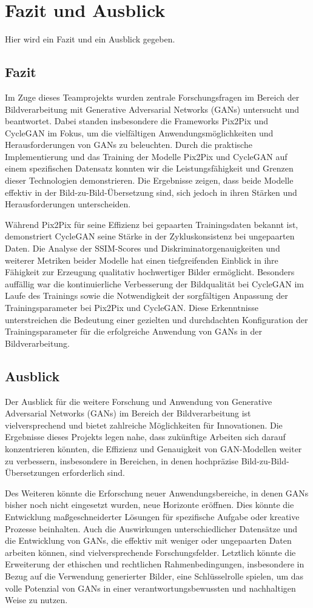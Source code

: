 \chapter{Fazit und Ausblick}
Hier wird ein Fazit und ein Ausblick gegeben.

\section{Fazit}
Im Zuge dieses Teamprojekts wurden zentrale Forschungsfragen im Bereich der Bildverarbeitung mit Generative Adversarial Networks (GANs) untersucht und beantwortet. Dabei standen insbesondere die Frameworks Pix2Pix und CycleGAN im Fokus, um die vielfältigen Anwendungsmöglichkeiten und Herausforderungen von GANs zu beleuchten. Durch die praktische Implementierung und das Training der Modelle Pix2Pix und CycleGAN auf einem spezifischen Datensatz konnten wir die Leistungsfähigkeit und Grenzen dieser Technologien demonstrieren. Die Ergebnisse zeigen, dass beide Modelle effektiv in der Bild-zu-Bild-Übersetzung sind, sich jedoch in ihren Stärken und Herausforderungen unterscheiden.

Während Pix2Pix für seine Effizienz bei gepaarten Trainingsdaten bekannt ist, demonstriert CycleGAN seine Stärke in der Zykluskonsistenz bei ungepaarten Daten. Die Analyse der SSIM-Scores und Diskriminatorgenauigkeiten und weiterer Metriken beider Modelle hat einen tiefgreifenden Einblick in ihre Fähigkeit zur Erzeugung qualitativ hochwertiger Bilder ermöglicht. Besonders auffällig war die kontinuierliche Verbesserung der Bildqualität bei CycleGAN im Laufe des Trainings sowie die Notwendigkeit der sorgfältigen Anpassung der Trainingsparameter bei Pix2Pix und CycleGAN. Diese Erkenntnisse unterstreichen die Bedeutung einer gezielten und durchdachten Konfiguration der Trainingsparameter für die erfolgreiche Anwendung von GANs in der Bildverarbeitung.

\section{Ausblick}
Der Ausblick für die weitere Forschung und Anwendung von Generative Adversarial Networks (GANs) im Bereich der Bildverarbeitung ist vielversprechend und bietet zahlreiche Möglichkeiten für Innovationen. Die Ergebnisse dieses Projekts legen nahe, dass zukünftige Arbeiten sich darauf konzentrieren könnten, die Effizienz und Genauigkeit von GAN-Modellen weiter zu verbessern, insbesondere in Bereichen, in denen hochpräzise Bild-zu-Bild-Übersetzungen erforderlich sind.

Des Weiteren könnte die Erforschung neuer Anwendungsbereiche, in denen GANs bisher noch nicht eingesetzt wurden, neue Horizonte eröffnen. Dies könnte die Entwicklung maßgeschneiderter Lösungen für spezifische Aufgabe oder kreative Prozesse beinhalten. Auch die Auswirkungen unterschiedlicher Datensätze und die Entwicklung von GANs, die effektiv mit weniger oder ungepaarten Daten arbeiten können, sind vielversprechende Forschungsfelder. Letztlich könnte die Erweiterung der ethischen und rechtlichen Rahmenbedingungen, insbesondere in Bezug auf die Verwendung generierter Bilder, eine Schlüsselrolle spielen, um das volle Potenzial von GANs in einer verantwortungsbewussten und nachhaltigen Weise zu nutzen.
